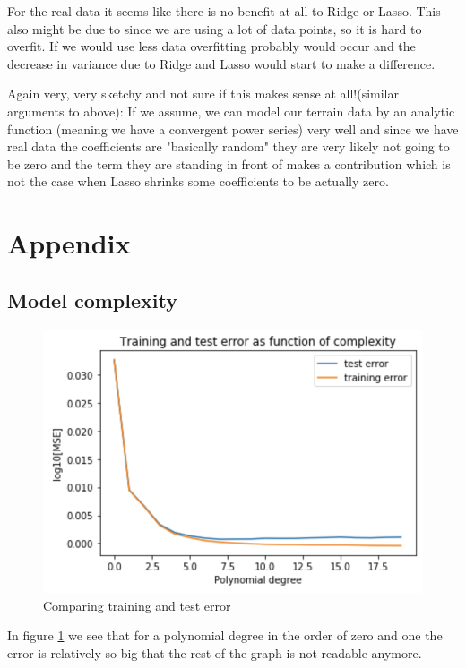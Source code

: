 \documentclass[12pt]{extarticle}
\begin{document}
For the real data it seems like there is no benefit at all to Ridge or Lasso. This also might be due to since we are using a lot of data points, so it is hard to overfit. If we would use less data overfitting probably would occur and the decrease in variance due to Ridge and Lasso would start to make a difference.


Again very, very sketchy and not sure if this makes sense at all!(similar arguments to above):
If we assume, we can model our terrain data by an analytic function (meaning we have a convergent power series) very well and since we have real data the coefficients are "basically random" they are very likely not going to be zero and the term they are standing in front of makes a contribution which is not the case when Lasso shrinks some coefficients to be actually zero.

\section{Appendix}

\subsection{Model complexity}

\begin{figure}
    \centering
    \includegraphics[width=0.9\linewidth]{13}
    \caption{Comparing training and test error}
    \label{fig:f11}
\end{figure}

In figure \ref{fig:f11} we see that for a polynomial degree in the order of zero and one the error is relatively so big that the rest of the graph is not readable anymore.
\end{document}
